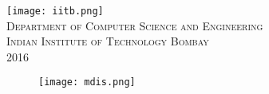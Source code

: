 \documentclass[a4paper,11pt]{report}
\begin{document}
\begin{titlepage}
\begin{center}
\texttt{[image: iitb.png]}\\[0.75cm]

\textsc{\large Department of Computer Science and Engineering\\Indian Institute of Technology Bombay\\2016}
\\[1cm]

\end{center}
\end{titlepage}
\clearpage


\newpage
{}
\setcounter{page}{2}
\begin{figure}[h]
\texttt{[image: mdis.png]}
\end{figure}
\end{document}
